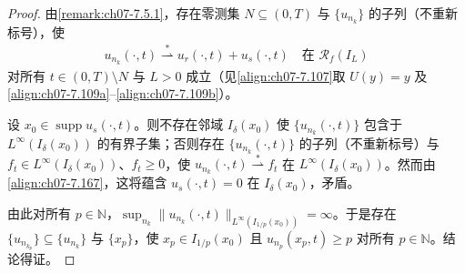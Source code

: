 \documentclass[../../main.tex]{subfiles}%
\begin{document}
\begin{proof}
由\cref{remark:ch07-7.5.1}，存在零测集 $N\subseteq(0,T)$ 与 $\{u_{n_k}\}$ 的子列（不重新标号），使
\begin{align}
u_{n_k}(\cdot,t)\stackrel{*}{\rightharpoonup}u_r(\cdot,t)+u_s(\cdot,t)\quad\text{在 }\mathscr{R}_f(I_L) \label{align:ch07-7.167}
\end{align}
对所有 $t\in(0,T)\setminus N$ 与 $L>0$ 成立（见\eqref{align:ch07-7.107}取 $U(y)=y$ 及\eqref{align:ch07-7.109a}--\eqref{align:ch07-7.109b}）。

设 $x_0\in\operatorname{supp}u_s(\cdot,t)$。则不存在邻域 $I_\delta(x_0)$ 使 $\{u_{n_k}(\cdot,t)\}$ 包含于 $L^\infty(I_\delta(x_0))$ 的有界子集；否则存在 $\{u_{n_k}(\cdot,t)\}$ 的子列（不重新标号）与 $f_t\in L^\infty(I_\delta(x_0))$、$f_t\geqslant0$，使 $u_{n_k}(\cdot,t)\stackrel{*}{\rightharpoonup}f_t$ 在 $L^\infty(I_\delta(x_0))$。然而由\eqref{align:ch07-7.167}，这将蕴含 $u_s(\cdot,t)=0$ 在 $I_\delta(x_0)$，矛盾。

由此对所有 $p\in\mathbb{N}$，$\sup_{n_k}\|u_{n_k}(\cdot,t)\|_{L^\infty(I_{1/p}(x_0))}=\infty$。于是存在 $\{u_{n_{k_p}}\}\subseteq\{u_{n_k}\}$ 与 $\{x_p\}$，使 $x_p\in I_{1/p}(x_0)$ 且 $u_{n_p}(x_p,t)\geqslant p$ 对所有 $p\in\mathbb{N}$。结论得证。
\end{proof}
\end{document}
